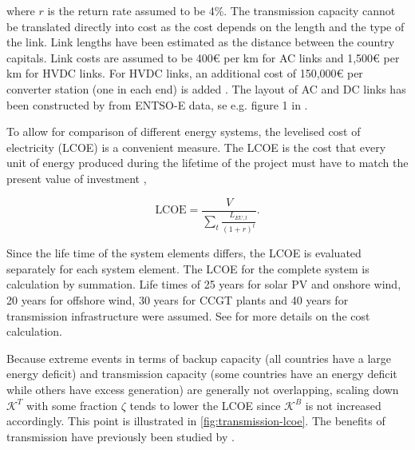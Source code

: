 \documentclass[a4paper, 5p, sort&compress]{elsarticle}%
\newcommand{\paren}[1]{\left(#1\right)}
\begin{document}
where $r$ is the return rate assumed to be 4\%. The transmission
capacity cannot be translated directly into cost as the cost depends
on the length and the type of the link. Link lengths have been
estimated as the distance between the country capitals. Link costs are
assumed to be 400\euro{}
per km for AC links and 1,500\euro{}
per km for HVDC links. For HVDC links, an additional cost of
150,000\euro{}
per converter station (one in each end) is added
\cite{McKinsey, Schaber, Schaber2}. The layout of AC and DC links has
been constructed by \cite{rolando2014} from ENTSO-E data, se
e.g. figure 1 in \cite{Sensitivity}.


To allow for comparison of different energy systems, the levelised
cost of electricity (LCOE) is a convenient measure. The LCOE is the
cost that every unit of energy produced during the lifetime of the
project must have to match the present value of investment
\cite{Short1995},

\begin{equation}
  \label{eq:7}
  \text{LCOE} = \frac{V}{\sum_{t} \frac{L_{EU,
        t}}{\paren{1+r}^{t}}} .
\end{equation}

Since the life time of the system elements differs, the LCOE is
evaluated separately for each system element. The LCOE for the
complete system is calculation by summation. Life times of 25 years
for solar PV and onshore wind, 20 years for offshore wind, 30 years
for CCGT plants and 40 years for transmission infrastructure were
assumed. See \cite{Sensitivity} for more details on the cost
calculation.

Because extreme events in terms of backup capacity (all countries have
a large energy deficit) and transmission capacity (some countries have
an energy deficit while others have excess generation) are generally
not overlapping, scaling down $\mathcal{K}^{T}$ with some fraction
$\zeta$ tends to lower the LCOE since $\mathcal{K}^{B}$ is not increased
accordingly. This point is illustrated in
\cref{fig:transmission-lcoe}. The benefits of transmission have
previously been studied by \cite{Rodriguez2013}.
\end{document}
